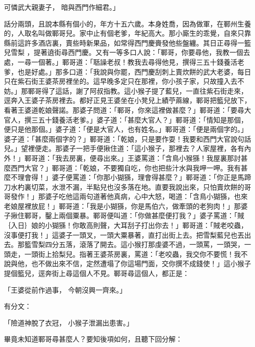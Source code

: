 \begin{showcontents}{}
可憐武大親妻子，  暗與西門作細君。」

話分兩頭，且說本縣有個小的，年方十五六歲。本身姓喬，因為做軍，在鄆州生養的，人取名叫做鄆哥兒。家中止有個老爹，年紀高大。那小廝生的乖覺，自來只靠縣前這許多酒店裏，賣些時新果品，如常得西門慶賫發他些盤纏。其日正尋得一籃兒雪梨 ，提著遶街尋西門慶。又有一等多口人說：「鄆哥，你要尋他，我教一個去處，一尋一個著。」鄆哥道：「聒譟老叔！教我去尋得他見，撰得三五十錢養活老爹，也是好處。」那多口道：「我說與你罷，西門慶刮刺上賣炊餅的武大老婆，每日只在紫石街王婆茶房裡坐的。這早晚多定只在那裡，你小孩子家，只故撞入去不妨。」那鄆哥得了這話，謝了阿叔指教。這小猴子提了藍兒，一直往紫石街走來，逕奔入王婆子茶房裡去。都好正見王婆坐在小凳兒上績苧蔴線，鄆哥把籃兒放下，看著王婆道乾娘聲諾。那婆子問道：「鄆哥，你來這裡做甚麼？」鄆哥道：「要尋大官人，撰三五十錢養活老爹。」婆子道：「甚麼大官人？」鄆哥道：「情知是那個，便只是他那個。」婆子道：「便是大官人，也有姓名。」鄆哥道：「便是兩個字的。」婆子道：「甚麼兩個字的？」鄆哥道：「乾娘，只是要作耍！我要和西門大官說句話兒。」望裡便走。那婆子一把手便揪住道：「這小猴子，那裡去？人家屋裡，各有內外！」鄆哥道：「我去房裏，便尋出來。」王婆罵道：「含鳥小猴猻！我屋裏那討甚麼西門大官？」鄆哥道：「乾娘，不要獨自吃，你也把些汁水與我呷一呷。我有甚麼不理會得！」婆子便罵道：「你那小猢猻，理會得甚麼？」鄆哥道：「你正是馬蹄刀水杓裏切菜，水泄不漏，半點兒也沒多落在地。直要我說出來，只怕賣炊餅的哥哥發作！」那婆子吃他這兩句道著他真病，心中大怒，喝道：「含鳥小猢猻，也來老娘屋裡放屁！」鄆哥道：「我是小猢猻，你是馬伯六，做牽頭的老狗肉！」那婆子揪住鄆哥，鑿上兩個粟暴。鄆哥便叫道：「你做甚麼便打我？」婆子罵道：「賊｛入日｝娘的小猢猻！你敢高則聲，大耳刮子打出你去！」鄆哥道：「賊老咬蟲，沒事便打我！」這婆子一頭叉，一頭大粟暴著，直打出街上去。把雪梨藍兒也丟出去。那籃雪梨四分五落，滾落了開去。這小猴打那虔婆不過，一頭罵，一頭哭，一頭走，一頭街上拾梨兒。指著王婆茶房裏，罵道：「老咬蟲，我交你不要慌！我不說與他，也不做出來不信，定然遭塌了你這場門面，交你撰不成錢使！」這小猴子提個籃兒，逕奔街上尋這個人不見。鄆哥尋這個人，都正是：

「王婆從前作過事，  今朝沒興一齊來。」

有分文：

「險道神脫了衣冠，  小猴子泄漏出患害。」

畢竟未知道鄆哥尋甚麼人？要知後項如何，且聽下回分解： 








\end{showcontents}


